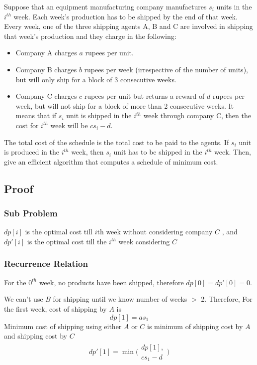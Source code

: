 \documentclass[12pt]{article}
\newenvironment{statement}{\color[rgb]{1.00,0.00,0.50} {}}{}
\begin{document}
\begin{statement}
    Suppose that an equipment manufacturing company manufactures $s_i$ units in the
$i^{th}$ week. Each week’s production has to be shipped by the end of that week. Every week, one of the
three shipping agents A, B and C are involved in shipping that week’s production and they charge
in the following:
\begin{itemize}
    \item Company A charges $a$ rupees per unit.
    \item  Company B charges $b$ rupees per week (irrespective of the number of units), but will only ship for a block of 3 consecutive weeks.
    \item Company C charges $c$ rupees per unit but returns a reward of $d$ rupees per week, but will
not ship for a block of more than 2 consecutive weeks. It means that if $s_i$ unit is shipped in
the $i^{th}$ week through company C, then the cost for $i^{th}$ week will be $c s_i - d$.
\end{itemize}
The total cost of the schedule is the total cost to be paid to the agents. If $s_i$ unit is produced in the
$i^{th}$ week, then $s_i$ unit has to be shipped in the $i^{th}$ week. Then, give an efficient algorithm that
computes a schedule of minimum cost.
\end{statement}


\subsection{Proof}

\subsubsection{Sub Problem}

$dp[i]$ is the optimal cost till $i$th week without considering company $C$ , and $dp'[i]$ is the optimal cost till the $i^{th}$ week considering $C$


\subsubsection{Recurrence Relation}

For the $0^{th}$ week, no products have been shipped, therefore 
$dp[0] = dp'[0] = 0$.

We can't use $B$ for shipping until we know number of weeks $>$ 2. Therefore,
For the first week,
cost of shipping by $A$ is
$$dp[1] = a s_1$$
Minimum cost of shipping using either $A$ or $C$ is minimum of shipping cost by $A$ and shipping cost by $C$
\begin{align*}
dp'[1] = \min \Biggl(
        \begin{array}{cc}
             dp[1],  \\
             c s_1 - d 
        \end{array}
        \Biggr) 
\end{align*}
\end{document}
